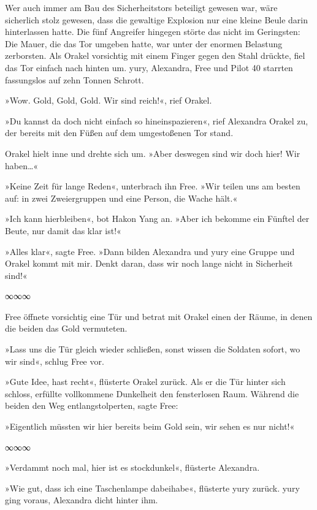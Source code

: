 Wer auch immer am Bau des Sicherheitstors beteiligt gewesen war, wäre sicherlich stolz gewesen, dass die gewaltige Explosion nur eine kleine Beule darin hinterlassen hatte. Die fünf Angreifer hingegen störte das nicht im Geringsten: Die Mauer, die das Tor umgeben hatte, war unter der enormen Belastung zerborsten. Als Orakel vorsichtig mit einem Finger gegen den Stahl drückte, fiel das Tor einfach nach hinten um. yury, Alexandra, Free und Pilot 40 starrten fassungslos auf zehn Tonnen Schrott.

»Wow. Gold, Gold, Gold. Wir sind reich!«, rief Orakel.

»Du kannst da doch nicht einfach so hineinspazieren«, rief Alexandra Orakel zu, der bereits mit den Füßen auf dem umgestoßenen Tor stand.

Orakel hielt inne und drehte sich um. »Aber deswegen sind wir doch hier! Wir haben…«

»Keine Zeit für lange Reden«, unterbrach ihn Free. »Wir teilen uns am besten auf: in zwei Zweiergruppen und eine Person, die Wache hält.«

»Ich kann hierbleiben«, bot Hakon Yang an. »Aber ich bekomme ein Fünftel der Beute, nur damit das klar ist!«

»Alles klar«, sagte Free. »Dann bilden Alexandra und yury eine Gruppe und Orakel kommt mit mir. Denkt daran, dass wir noch lange nicht in Sicherheit sind!«

\begin{center}
    ∞∞∞
\end{center}

Free öffnete vorsichtig eine Tür und betrat mit Orakel einen der Räume, in denen die beiden das Gold vermuteten.

»Lass uns die Tür gleich wieder schließen, sonst wissen die Soldaten sofort, wo wir sind«, schlug Free vor.

»Gute Idee, hast recht«, flüsterte Orakel zurück. Als er die Tür hinter sich schloss, erfüllte vollkommene Dunkelheit den fensterlosen Raum. Während die beiden den Weg entlangstolperten, sagte Free:

»Eigentlich müssten wir hier bereits beim Gold sein, wir sehen es nur nicht!«

\begin{center}
    ∞∞∞
\end{center}

»Verdammt noch mal, hier ist es stockdunkel«, flüsterte Alexandra.

»Wie gut, dass ich eine Taschenlampe dabeihabe«, flüsterte yury zurück. yury ging voraus, Alexandra dicht hinter ihm.

